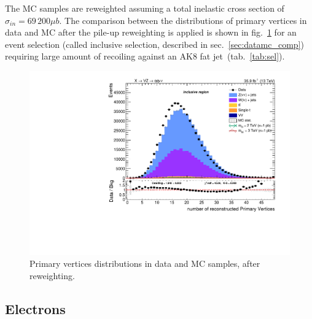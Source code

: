 \noindent The MC samples are reweighted assuming a total inelastic cross section of $\sigma_{in} = 69\,200 \mu b$. The comparison between the distributions of primary vertices in data and MC after the pile-up reweighting is applied is shown in fig.~\ref{fig:npv} for an event selection (called inclusive selection, described in sec.~\ref{sec:datamc_comp}) requiring large amount of \met recoiling against an AK8 fat jet~(tab.~\ref{tab:sel}).
 
 \begin{figure}[!htb]
  \centering
    \includegraphics[width=.495\textwidth]{plots/v9_thesis/XVZnnInc/nPV.pdf}
  \caption{Primary vertices distributions in data and MC samples, after reweighting.}
  \label{fig:npv}
 \end{figure}


\subsection{Electrons}\label{ssec:electrons}

